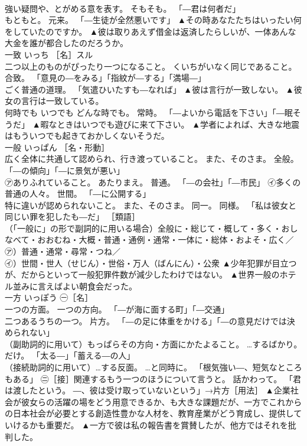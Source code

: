 \documentclass[8pt]{extreport}
\begin{document}
\begin{CJK}{UTF8}{min}
\\	強い疑問や、とがめる意を表す。 そもそも。 「―君は何者だ」 
\\	もともと。 元来。 「―生徒が全然悪いです」	▲その時あなたたちはいったい何をしていたのですか。 ▲彼は取りあえず借金は返済したらしいが、一体あんな大金を誰が都合したのだろうか。
\\	一致	いっち	［名］スル 
\\	二つ以上のものがぴったり一つになること。 くいちがいなく同じであること。 合致。 「意見の―をみる」「指紋が―する」「満場―」 
\\	ごく普通の道理。 「気遣ひいたすも―なれば」	▲彼は言行が一致しない。 ▲彼女の言行は一致している。
\\	何時でも	いつでも	どんな時でも。 常時。 「―よいから電話を下さい」「―眠そうだ」	▲暇なときはいつでも遊びに来て下さい。 ▲学者によれば、大きな地震はもういつでも起きておかしくないそうだ。
\\	一般	いっぱん	［名・形動］ 
\\	広く全体に共通して認められ、行き渡っていること。 また、そのさま。 全般。 「―の傾向」「―に景気が悪い」 
\\	㋐ありふれていること。 あたりまえ。 普通。 「―の会社」「―市民」 ㋑多くの普通の人々。 世間。 「―に公開する」 
\\	特に違いが認められないこと。 また、そのさま。 同一。 同様。 「私は彼女と同じい罪を犯したも―だ」 ［類語］
\\	（「一般に」の形で副詞的に用いる場合）全般に・総じて・概して・多く・おしなべて・おおむね・大概・普通・通例・通常・一体に・総体・およそ・広く／
\\	㋐）普通・通常・尋常・つね／
\\	㋑）世間・世人（せじん）・世俗・万人（ばんにん）・公衆	▲少年犯罪が目立つが、だからといって一般犯罪件数が減少したわけではない。 ▲世界一般のホテル並みに言えばよい朝食会だった。
\\	一方	いっぽう	㊀［名］ 
\\	一つの方面。 一つの方向。 「―が海に面する町」「―交通」 
\\	二つあるうちの一つ。 片方。 「―の足に体重をかける」「―の意見だけでは決められない」 
\\	（副助詞的に用いて）もっぱらその方向・方面にかたよること。 …するばかり。 だけ。 「太る―」「蓄える―の人」 
\\	（接続助詞的に用いて）…する反面。 …と同時に。 「根気強い―、短気なところもある」 ㊁［接］関連するもう一つのほうについて言うと。 話かわって。 「君は渡したという。 ―、彼は受け取っていないという」→片方［用法］	▲企業社会が彼女らの活躍の場をどう用意できるか、も大きな課題だが、一方でこれからの日本社会が必要とする創造性豊かな人材を、教育産業がどう育成し、提供していけるかも重要だ。 ▲一方で彼は私の報告書を賞賛したが、他方ではそれを批判した。

\end{CJK}
\end{document}
